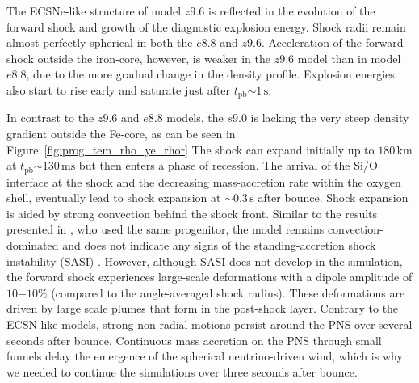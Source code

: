 \documentclass[fleqn,usenatbib]{mnras}
\newcommand{\tpb}{\ensuremath{t_{\text{pb}}}}
\newcommand{\km}{\ensuremath{\mathrm{km}}}
\newcommand{\s}{\ensuremath{\text{s}}}
\newcommand{\ms}{\ensuremath{\text{ms}}}
\newcommand{\GEO}[1]{{\color{red}#1}}
\begin{document}
The ECSNe-like structure of model $z9.6$ is reflected in the evolution of the forward shock and growth of the diagnostic explosion energy. Shock radii remain almost perfectly spherical \GEO{in both the $e8.8$ and $z9.6$}. Acceleration of the forward shock outside the iron-core, however, is weaker in the $z9.6$ model than in model $e8.8$, due to the more gradual change in the density profile. Explosion energies also start to rise early and saturate just after $\tpb\mathord{\sim}1\,\s$.

In contrast to the $z9.6$ and $e8.8$ models, the $s9.0$ is lacking the very steep density gradient outside the Fe-core, as can be seen in Figure~\ref{fig:prog_tem_rho_ye_rhor}
The shock can expand initially up to $180\,\km$ at $\tpb\mathord{\sim}130\,\ms$ but then \GEO{enters a phase of recession}. The \GEO{arrival} of the Si/O interface at the shock and \GEO{the decreasing mass-accretion rate} within the oxygen shell, eventually lead to shock expansion at $\mathord{\sim}0.3\,\s$ after bounce. Shock expansion is aided by strong convection behind the shock front. Similar to the results presented in \cite{Glas2019}, who used the same progenitor, the model remains convection-dominated and does not indicate any signs of the standing-accretion shock instability (SASI) \citep{Blondin2003,Foglizzo2007}.
However, although SASI does not develop in the simulation, the forward shock experiences \GEO{large-scale deformations with a dipole amplitude of $10\mathord{-}10\%$ (compared to the angle-averaged shock radius)}. These deformations are driven by large scale plumes that form in the post-shock layer. 
Contrary to the ECSN-like models, strong non-radial motions persist \GEO{around the PNS} over several seconds after bounce. Continuous mass accretion on the PNS through small funnels delay the emergence of the spherical neutrino-driven wind, which is why we needed to continue the simulations over three seconds after bounce.
\end{document}
